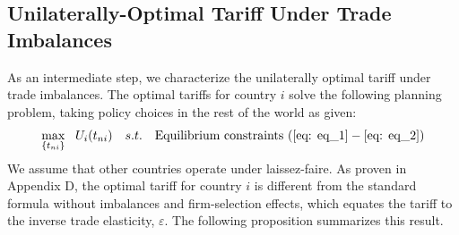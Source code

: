 \documentclass[12pt]{article}
\begin{document}

\subsection{Unilaterally-Optimal Tariff Under Trade Imbalances}
As an intermediate step, we characterize the unilaterally optimal tariff under trade imbalances. The optimal tariffs for country $i$ solve the following planning problem, taking policy choices in the rest of the world as given:
\[
\max_{\{t_{ni}\}}\ \ U_{i}({t_{ni}})\quad s.t.\quad\text{Equilibrium constraints } ( \ref{eq: eq_1}-  \ref{eq: eq_2})
\]
We assume that other countries operate under laissez-faire. As proven in Appendix D, the optimal tariff for country $i$ is different from the standard formula without imbalances and firm-selection effects, which equates the tariff to the inverse trade elasticity, $\varepsilon$. The following proposition summarizes this result. 
\end{document}
